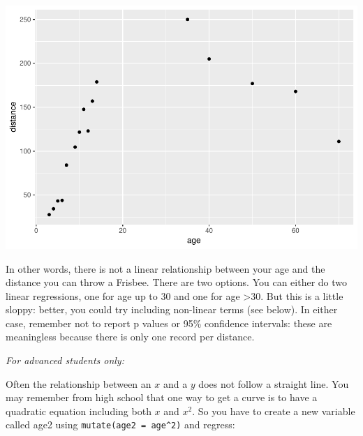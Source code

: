 \documentclass[]{book}
\newenvironment{Shaded}{\begin{snugshade}}{\end{snugshade}}
\newcommand{\DataTypeTok}[1]{\textcolor[rgb]{0.13,0.29,0.53}{#1}}
\newcommand{\DecValTok}[1]{\textcolor[rgb]{0.00,0.00,0.81}{#1}}
\newcommand{\KeywordTok}[1]{\textcolor[rgb]{0.13,0.29,0.53}{\textbf{#1}}}
\newcommand{\NormalTok}[1]{#1}
\newcommand{\OperatorTok}[1]{\textcolor[rgb]{0.81,0.36,0.00}{\textbf{#1}}}
\newcommand{\StringTok}[1]{\textcolor[rgb]{0.31,0.60,0.02}{#1}}
\begin{document}
\includegraphics{09-answers_files/figure-latex/week53-1.pdf}

In other words, there is not a linear relationship between your age and
the distance you can throw a Frisbee. There are two options. You can
either do two linear regressions, one for age up to 30 and one for age
\textgreater30. But this is a little sloppy: better, you could try
including non-linear terms (see below). In either case, remember not to
report p values or 95\% confidence intervals: these are meaningless
because there is only one record per distance.

\emph{For advanced students only:}

Often the relationship between an \(x\) and a \(y\) does not follow a
straight line. You may remember from high school that one way to get a
curve is to have a quadratic equation including both \(x\) and \(x^2\).
So you have to create a new variable called age2 using
\texttt{mutate(age2\ =\ age\^{}2)} and regress:

\begin{Shaded}
\end{Shaded}
\end{document}
